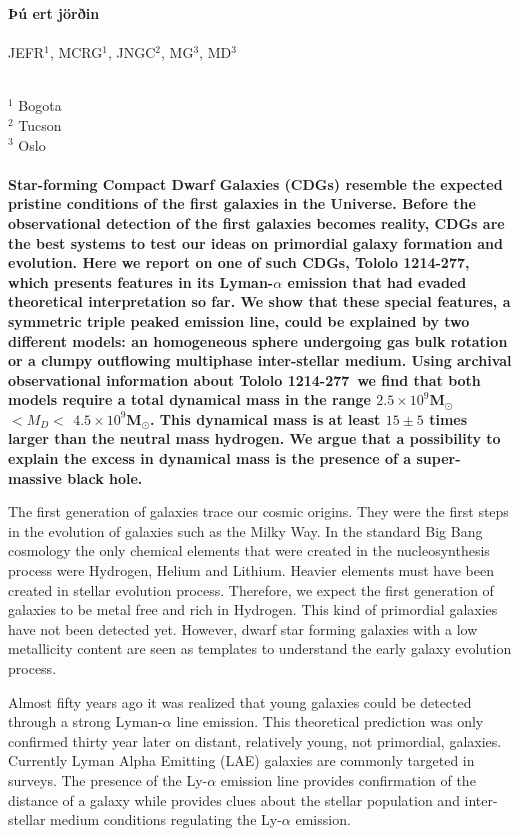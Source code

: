\documentclass[a4paper, usenatbib, 12pt]{article}
\newcommand{\tol}{Tololo 1214-277}
\begin{document}
\pagestyle{empty}
\noindent
\textbf{Þú ert jörðin}
\\
\\
JEFR$^{1}$, MCRG$^1$, JNGC$^2$, MG$^3$, MD$^3$
\\
\\
\scriptsize
{$^1$ Bogota
\\
$^2$ Tucson
\\
$^3$ Oslo
\normalsize
\\
\\
\textbf{
  Star-forming Compact Dwarf Galaxies (CDGs) resemble the expected
  pristine conditions of the first galaxies in the Universe.    
Before the observational detection of the first galaxies becomes
reality, CDGs are the best systems to test our ideas on primordial
galaxy formation and evolution.    
Here we report on one of such CDGs, \tol, which presents
features in its Lyman-$\alpha$ emission that had evaded theoretical
interpretation so far. 
We show that these special features, a symmetric triple peaked
emission line, could be explained by two different models: an
homogeneous sphere undergoing gas bulk rotation or a clumpy outflowing
multiphase inter-stellar medium.
Using archival observational information about \tol\ we 
find that both models require a total dynamical mass in the range
$2.5\times 10^{9}$M$_{\odot}$ $<M_D<$  $4.5\times 10^{9}$M$_{\odot}$.  
This dynamical mass is at least $15\pm 5$ times
larger than the neutral mass hydrogen.
We argue that a possibility to explain the excess in
dynamical mass is the presence of a super-massive black hole.}  



The first generation of galaxies trace our cosmic origins. 
They were the first steps in the evolution of galaxies such as the Milky
Way. 
In the standard Big Bang cosmology the only chemical elements that
were created in the nucleosynthesis process were Hydrogen, Helium and
Lithium.  
Heavier elements must have been created in stellar evolution process. 
Therefore, we expect the first generation of
galaxies to be metal free and rich in Hydrogen. 
This kind of primordial galaxies have not been detected yet. 
However, dwarf star forming galaxies with a low metallicity content
are seen as templates to understand the early galaxy evolution process. 

Almost fifty years ago \cite{PartridgePeebles} it was realized that
young galaxies could be detected through a strong Lyman-$\alpha$ line
emission.  
This theoretical prediction was only confirmed thirty year later on
distant, relatively young, not primordial, galaxies.
Currently Lyman Alpha Emitting (LAE) galaxies are commonly targeted
in surveys. 
The presence of the Ly-$\alpha$ emission line provides confirmation of
the distance of a galaxy while provides clues about the stellar
population and inter-stellar medium conditions regulating the
Ly-$\alpha$ emission. 

}
\end{document}
